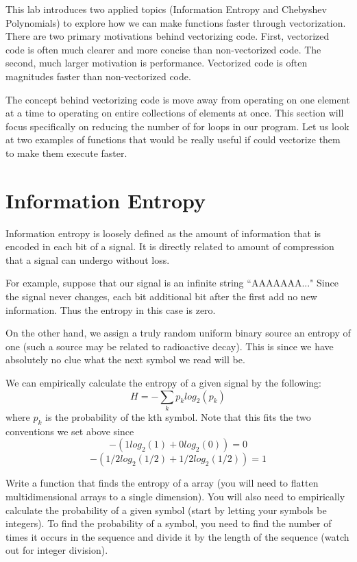 

This lab introduces two applied topics (Information Entropy and Chebyshev Polynomials) to explore how we can make functions faster through vectorization.  There are two primary motivations behind vectorizing code.  First, vectorized code is often much clearer and more concise than non-vectorized code.  The second, much larger motivation is performance.  Vectorized code is often magnitudes faster than non-vectorized code.  

The concept behind vectorizing code is move away from operating on one element at a time to operating on entire collections of elements at once.  This section will focus specifically on reducing the number of for loops in our program.  Let us look at two examples of functions that would be really useful if could vectorize them to make them execute faster.

\section*{Information Entropy}

Information entropy is loosely defined as the amount of information that is encoded in each bit of a signal. It is directly related to amount of compression that a signal can undergo without loss.

For example, suppose that our signal is an infinite string ``AAAAAAA..." Since the signal never changes, each bit additional bit after the first add no new information. Thus the entropy in this case is zero.

On the other hand, we assign a truly random uniform binary source an entropy of one (such a source may be related to radioactive decay). This is since we have absolutely no clue what the next symbol we read will be.

We can empirically calculate the entropy of a given signal by the following:
\[
H = -\sum_k{p_k log_2(p_k)}
\]
where $p_k$ is the probability of the kth symbol. Note that this fits the two conventions we set above since
\[
-(1log_2(1) + 0 log_2(0)) = 0
\]
\[
-(1/2log_2(1/2) + 1/2log_2(1/2)) = 1
\]

\begin{problem}
Write a function that finds the entropy of a array (you will need to flatten multidimensional arrays to a single dimension). You will also need to empirically calculate the probability of a given symbol (start by letting your symbols be integers). To find the probability of a symbol, you need to find the number of times it occurs in the sequence and divide it by the length of the sequence (watch out for integer division).  
\end{problem}

